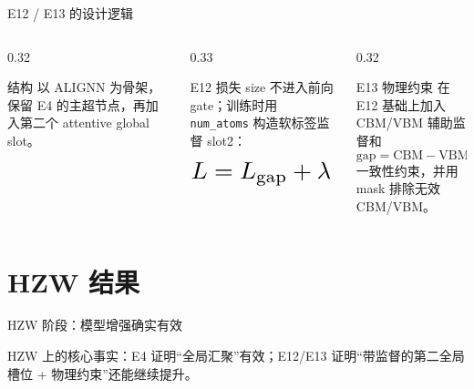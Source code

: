 \documentclass[aspectratio=169]{beamer}
\begin{document}
\begin{frame}{E12 / E13 的设计逻辑}
\small
\begin{columns}[T,onlytextwidth]
\begin{column}{0.32\textwidth}
\begin{block}{结构}
以 ALIGNN 为骨架，保留 E4 的主超节点，再加入第二个 attentive global slot。
\end{block}
\end{column}
\begin{column}{0.33\textwidth}
\begin{block}{E12 损失}
\scriptsize
size 不进入前向 gate；训练时用 \texttt{num\_atoms} 构造软标签监督 slot2：
\[
\resizebox{0.95\linewidth}{!}{$
L = L_{\text{gap}} + \lambda \cdot \mathrm{BCE}\bigl(g,\sigma((N-80)/18)\bigr)
$}
\]
\end{block}
\end{column}
\begin{column}{0.32\textwidth}
\begin{block}{E13 物理约束}
在 E12 基础上加入 CBM/VBM 辅助监督和
\[
\text{gap} = \text{CBM} - \text{VBM}
\]
一致性约束，并用 mask 排除无效 CBM/VBM。
\end{block}
\end{column}
\end{columns}
\end{frame}

\section{HZW 结果}

\begin{frame}{HZW 阶段：模型增强确实有效}
\scriptsize
\centering
{}

\vspace{1mm}
\small
HZW 上的核心事实：E4 证明“全局汇聚”有效；E12/E13 证明“带监督的第二全局槽位 + 物理约束”还能继续提升。
\end{frame}
\end{document}
